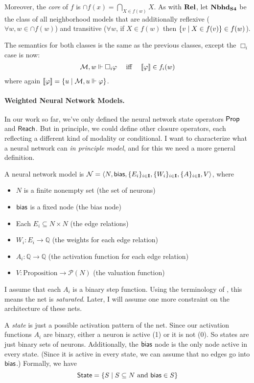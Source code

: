 \documentclass[letterpaper]{article}
\begin{document}
Moreover, the \emph{core} of $f$ is $\cap f(x) = \bigcap_{X \in f(w)} X$.  As with $\textrm{\textbf{Rel}}$, let $\textrm{\textbf{Nbhd}}_\textrm{\textbf{S4}}$ be the class of all neighborhood models that are additionally reflexive ($\forall w, w \in \cap f(w)$) and transitive ($\forall w$, if $X \in f(w)$ then $\{ v \mid X \in f(v) \} \in f(w)$).

The semantics for both classes is the same as the previous classes, except the $\Box_i$ case is now:
\[
\begin{array}{lcl}
    \mathcal{M}, w \Vdash \Box_i \varphi & \mbox{ iff } & [\![\mbox{\em $ \varphi $\/}]\!] \in f_i(w)
\end{array}
\]
where again $[\![\mbox{\em $ \varphi $\/}]\!] = \{ u \mid \mathcal{M}, u \Vdash \varphi \}$.

\paragraph*{Weighted Neural Network Models.} 
In our work \cite{kisby2024hebbian} so far, we've only defined the neural network state operators $\mathsf{Prop}$ and $\mathsf{Reach}$.  But in principle, we could define other closure operators, each reflecting a different kind of modality or conditional.  I want to characterize what a neural network  can \emph{in principle model}, and for this we need a more general definition.

A neural network model is $\mathcal{N} = \langle N, \mathsf{bias}, \{ E_i \}_{i \in \textbf{I}}, \{ W_i \}_{i \in \textbf{I}}, \{ A \}_{i \in \textbf{I}}, V \rangle$, where
\begin{itemize}
    \item $N$ is a finite nonempty set (the set of neurons)
    \item $\mathsf{bias}$ is a fixed node (the bias node)
    \item Each $E_i \subseteq N \times N$ (the edge relations)
    \item $W_i : E_i \to \mathbb{Q}$ (the weights for each edge relation)
    \item $A_i : \mathbb{Q} \to \mathbb{Q}$ (the activation function for each edge relation)
    \item $V : \textrm{Proposition} \to \mathcal{P}(N)$ (the valuation function)
\end{itemize}
I assume that each $A_i$ is a binary step function. Using the terminology of \cite{merrill2020formal}, this means the net is \emph{saturated}.  Later, I will assume one more constraint on the architecture of these nets.

A \emph{state} is just a possible activation pattern of the net. Since our activation functions $A_i$ are binary, either a neuron is active (1) or it is not (0).  So states are just binary sets of neurons. Additionally, the $\mathsf{bias}$ node is the only node active in every state. (Since it is active in every state, we can assume that no edges go into $\mathsf{bias}$.) Formally, we have
\[
    \mathsf{State} = \{ S \mid S \subseteq N \mbox{ and } \mathsf{bias} \in S \}
\]
\end{document}
